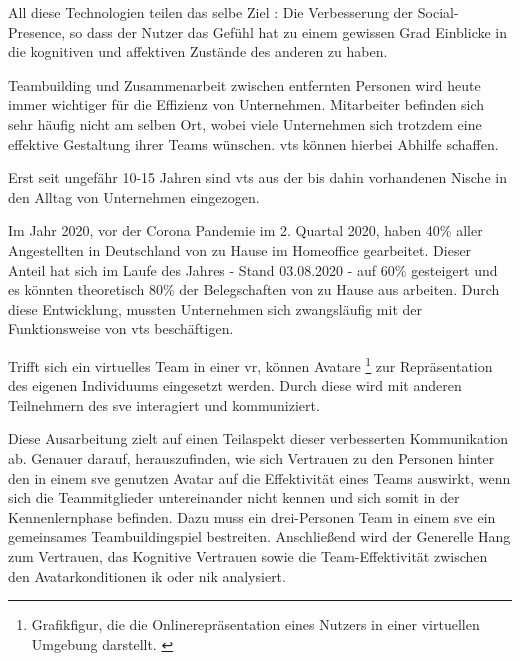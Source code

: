 \documentclass[a4paper,11pt]{article}%
\renewcommand{\\}{\vspace*{0.5\baselineskip} \newline}
\begin{document}
All diese Technologien teilen das selbe Ziel : \\ \dq{}Die Verbesserung der Social-Presence, so dass der Nutzer das Gefühl hat zu einem gewissen Grad Einblicke in die kognitiven und affektiven Zustände des anderen zu haben.\dq{} \citep{biocca2002defining} \citep[p.407–447]{biocca2001plugging}

Teambuilding und Zusammenarbeit zwischen entfernten Personen wird heute immer wichtiger für die Effizienz von Unternehmen. Mitarbeiter befinden sich sehr häufig nicht am selben Ort, wobei viele Unternehmen sich trotzdem eine effektive Gestaltung ihrer Teams wünschen.\citep[p.791-792]{jarvenpaa1999communication} \ac{vts} können hierbei Abhilfe schaffen. 
	
Erst seit ungefähr 10-15 Jahren sind \ac{vts} aus der bis dahin vorhandenen Nische in den Alltag von Unternehmen eingezogen. \citep{gilson2015virtual}

Im Jahr 2020, vor der Corona Pandemie im 2. Quartal 2020, haben 40\% aller Angestellten in Deutschland von zu Hause im \flqq Homeoffice\dq{} gearbeitet. Dieser Anteil hat sich im Laufe des Jahres - Stand 03.08.2020 - auf 60\% gesteigert und es könnten theoretisch 80\% der Belegschaften von zu Hause aus arbeiten. \citep{statistaCorona2020} Durch diese Entwicklung, mussten Unternehmen sich zwangsläufig mit der Funktionsweise von \ac{vts} beschäftigen.

Trifft sich ein virtuelles Team in einer \ac{vr}, können Avatare \footnote{Grafikfigur, die die Onlinerepräsentation eines Nutzers in einer virtuellen Umgebung darstellt. \citep[p.1]{neustaedter2009presenting}} zur Repräsentation des eigenen Individuums eingesetzt werden. Durch diese wird mit anderen Teilnehmern des \ac{sve} interagiert und kommuniziert.

Diese Ausarbeitung zielt auf einen Teilaspekt dieser verbesserten Kommunikation ab. Genauer darauf, herauszufinden, wie sich Vertrauen zu den Personen hinter den in einem \ac{sve} genutzen Avatar auf die Effektivität eines Teams auswirkt, wenn sich die Teammitglieder untereinander nicht kennen und sich somit in der \dq Kennenlernphase\dq{} befinden. Dazu muss ein drei-Personen Team in einem \ac{sve} ein gemeinsames Teambuildingspiel bestreiten.
Anschließend wird der Generelle Hang zum Vertrauen, das Kognitive Vertrauen sowie die Team-Effektivität zwischen den Avatarkonditionen \ac{ik} oder \ac{nik} analysiert. 


\newpage
\end{document}
